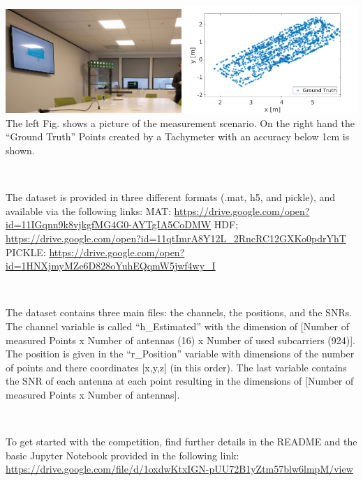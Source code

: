 \documentclass[letter]{moderncv} %
\begin{document}
\includegraphics[width=0.5\textwidth]{ParisEnvironment}\includegraphics[width=0.5\textwidth]{IndoorDataset}
The left Fig. shows a picture of the measurement scenario. On the right hand the ``Ground Truth'' Points created by a Tachymeter with an accuracy below 1cm is shown.
\vspace{4ex}


~

The dataset is provided in three different formats (.mat, h5, and pickle), and    available via the following links: \newline
  MAT:    \url{https://drive.google.com/open?id=11IGqnn9k8vjkgfMG4G0-AYTgIA5CoDMW} \newline
  HDF;    \url{https://drive.google.com/open?id=11qtImrA8Y12L_2RncRC12GXKo0pdrYhT} \newline
  PICKLE: \url{https://drive.google.com/open?id=1HNXjmyMZe6D828oYuhEQqmW5jwf4wy_I} \newline

~

The dataset contains three main files: the channels, the positions, and the SNRs. The channel variable is called ``h\_Estimated'' with the dimension of [Number of measured Points x Number of antennas (16) x Number of used subcarriers (924)]. The position is given in the ``r\_Position'' variable with dimensions of the number of points  and there coordinates [x,y,z] (in this order). The last variable contains the SNR of each antenna at each point resulting in the dimensions 
of [Number of measured Points x Number of antennas].

~


To get started with the competition, find further details in the README and the basic Jupyter Notebook provided in the following link:\newline
\url{https://drive.google.com/file/d/1oxdwKtxIGN-pUU72B1yZtm57blw6lmpM/view}
\end{document}
